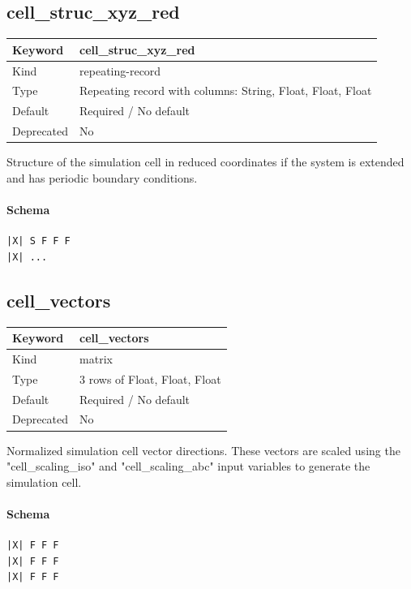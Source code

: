 \documentclass[11pt]{article}
\begin{document}
\subsection{cell\_struc\_xyz\_red}
\label{kw:cell-struc-xyz-red}
\begin{longtable}{|p{1.5in}|p{4.5in}|}
\hline
Keyword & cell\_struc\_xyz\_red \\
\hline
Kind & repeating-record \\
\hline
Type & Repeating record with columns: String, Float, Float, Float \\
\hline
Default & Required / No default \\
\hline
Deprecated & No \\
\hline
\end{longtable}
 Structure of the simulation cell in reduced coordinates if the system is
 extended and has periodic boundary conditions.

\paragraph{Schema}
\begin{Verbatim}
|X| S F F F
|X| ...
\end{Verbatim}

\subsection{cell\_vectors}
\label{kw:cell-vectors}
\begin{longtable}{|p{1.5in}|p{4.5in}|}
\hline
Keyword & cell\_vectors \\
\hline
Kind & matrix \\
\hline
Type & 3 rows of Float, Float, Float \\
\hline
Default & Required / No default \\
\hline
Deprecated & No \\
\hline
\end{longtable}
 Normalized simulation cell vector directions. These vectors are scaled using
 the "cell\_scaling\_iso" and "cell\_scaling\_abc" input variables to generate the
 simulation cell.

\paragraph{Schema}
\begin{Verbatim}
|X| F F F
|X| F F F
|X| F F F
\end{Verbatim}
\end{document}
